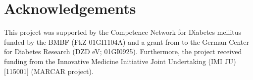 \documentclass[final,5p,times,twocolumn]{elsarticle}
\begin{document}
\section{Acknowledgements}
This project was supported by the Competence Network for Diabetes mellitus funded
by the BMBF (FkZ 01GI1104A) and a grant from to the German Center for Diabetes Research (DZD eV; 01GI0925). Furthermore, the project received funding from the Innovative Medicine Initiative Joint Undertaking (IMI JU) [115001] (MARCAR project).














\end{document}
